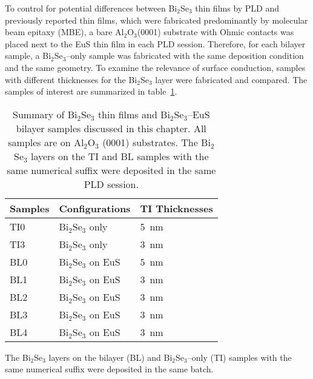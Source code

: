 To control for potential differences between Bi$_2$Se$_3$ thin films by PLD and previously reported thin films, which were fabricated predominantly by molecular beam epitaxy (MBE), a bare Al$_2$O$_3$(0001) substrate with Ohmic contacts was placed next to the EuS thin film in each PLD session. Therefore, for each bilayer sample, a Bi$_2$Se$_3$--only sample was fabricated with the same deposition condition and the same geometry. To examine the relevance of surface conduction, samples with different thicknesses for the Bi$_2$Se$_3$ layer were fabricated and compared. The samples of interest are summarized in table~\ref{tab:bl2014_samples}.%
\begin{table}[ht]
    \centering
    \begin{tabularx}{0.6\columnwidth}[t]{l|l|X}
    \caption[Summary of Bi$_2$Se$_3$ thin films and Bi$_2$Se$_3$--EuS bilayer samples]{\label{tab:bl2014_samples}Summary of Bi$_2$Se$_3$ thin films and Bi$_2$Se$_3$--EuS bilayer samples discussed in this chapter. All samples are on Al$_2$O$_3$ (0001) substrates. The Bi$_2$Se$_3$ layers on the TI and BL samples with the same numerical suffix were deposited in the same PLD session.}\\
		\hline\hline
        Samples & Configurations & TI Thicknesses\\
        \hline
        TI0 & Bi$_2$Se$_3$ only & 5~nm\\
        TI3 & Bi$_2$Se$_3$ only & 3~nm\\
        BL0 & Bi$_2$Se$_3$ on EuS & 5~nm\\
        BL1 & Bi$_2$Se$_3$ on EuS & 3~nm\\
        BL2 & Bi$_2$Se$_3$ on EuS & 3~nm\\
        BL3 & Bi$_2$Se$_3$ on EuS & 3~nm\\
        BL4 & Bi$_2$Se$_3$ on EuS & 3~nm\\
		\hline\hline
    \end{tabularx}
\end{table} %
The Bi$_2$Se$_3$ layers on the bilayer (BL) and Bi$_2$Se$_3$--only (TI) samples with the same numerical suffix were deposited in the same batch.

\FloatBarrier%
